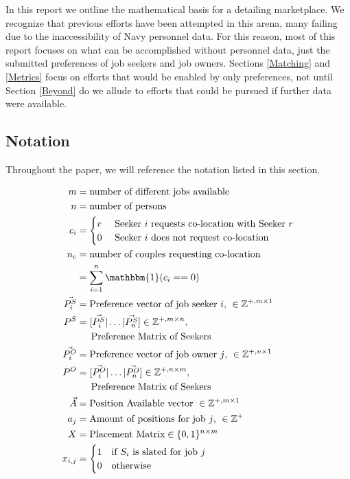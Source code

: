 In this report we outline the mathematical basis for a detailing marketplace. We recognize that previous efforts have been attempted in this arena, many failing due to the inaccessibility of Navy personnel data. For this reason, most of this report focuses on what can be accomplished without personnel data, just the submitted preferences of job seekers and job owners.  Sections \ref{Matching} and \ref{Metrics} focus on efforts that would be enabled by only preferences, not until Section \ref{Beyond} do we allude to efforts that could be pursued if further data were available.

\subsection{Notation}

Throughout the paper, we will reference the notation listed in this section.

\begin{align}
m &= \text{number of different jobs available}\\
n &= \text{number of persons}\\
c_i &= \begin{cases}
r & \text{ Seeker $i$ requests co-location with Seeker $r$} \\
0 & \text{ Seeker $i$ does not request co-location}
\end{cases} \\
n_c &= \text{number of couples requesting co-location}\\
&= \sum_{i=1}^n\mathbbm{1}(c_i == 0) \\
\vec{P^S_i} &= \text{Preference vector of job seeker $i$, } \in \mathbb{Z}^{+, m \times 1} \\
P^S &= [\vec{P^S_i} | \dots | \vec{P^S_n}] \in \mathbb{Z}^{+, m \times n}, \\ 
&\text{\indent Preference Matrix of Seekers} \\
\vec{P^O_i} &= \text{Preference vector of job owner $j$, } \in \mathbb{Z}^{+, n \times 1} \\
P^O &= [\vec{P^O_i} | \dots | \vec{P^O_n}] \in \mathbb{Z}^{+, n \times m}, \\ 
&\text{\indent Preference Matrix of Seekers} \\
\vec{A} &= \text{Position Available vector }\in \mathbb{Z}^{+, m \times 1} \\
a_j &= \text{Amount of positions for job $j$, } \in \mathbb{Z}^{+} \\
X &= \text{Placement Matrix} \in \{0,1\}^{n \times m} \\
x_{i,j} &= \begin{cases}
1 & \text{if $S_i$ is slated for job $j$}\\
0 & \text{otherwise}
\end{cases}
\end{align}

